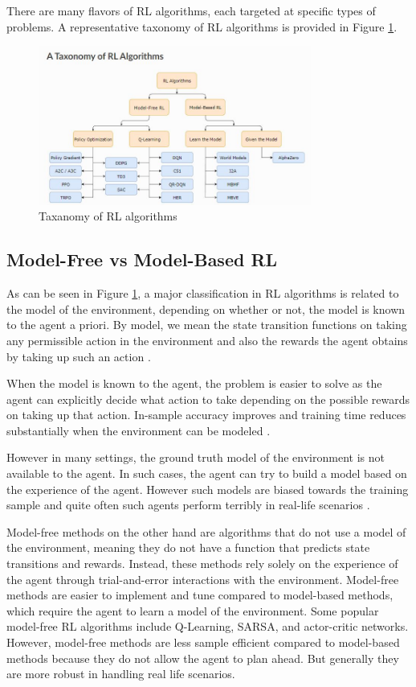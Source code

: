 There are many flavors of RL algorithms, each targeted  at specific types of problems. A representative taxonomy of RL algorithms is provided in Figure \ref{fig:taxanomy}.

\begin{figure}[htpb]
  \centering
  \includegraphics[width=0.8\textwidth]{figures/Taxanomy.jpg}
  \caption{Taxanomy of RL algorithms} \label{fig:taxanomy}
\end{figure}


\subsection{Model-Free vs Model-Based RL}
As can be seen in Figure \ref{fig:taxanomy}, a major classification in RL algorithms is related to the model of the environment, depending on whether or not, the model is known to the agent a priori. By model, we mean the state transition functions on taking any permissible action in the environment and also the rewards the agent obtains by taking up such an action \cite{sutton2018reinforcement}.

When the model is known to the agent, the problem is easier to solve as the agent can explicitly decide what action to take depending on the possible rewards on taking up that action. In-sample accuracy improves and training time reduces substantially when the environment can be modeled \cite{nguyen2017review}.

However in many settings, the ground truth model of the environment is  not available to the agent. 
In such cases, the agent can try to build a model based on the experience of the agent. However  such models are biased towards the training sample and quite often such agents perform terribly in real-life scenarios \cite{kaelbling1996reinforcement}.

Model-free methods on the other hand are algorithms that do not use a model of the environment, meaning they do not have a function that predicts state transitions and rewards. Instead, these methods rely solely on the experience of the agent through trial-and-error interactions with the environment. Model-free methods are easier to implement and tune compared to model-based methods, which require the agent to learn a model of the environment. Some popular model-free RL algorithms include Q-Learning, SARSA, and actor-critic networks. However, model-free methods are less sample efficient compared to model-based methods because they do not allow the agent to plan ahead. But generally they are more robust in handling real life scenarios.



